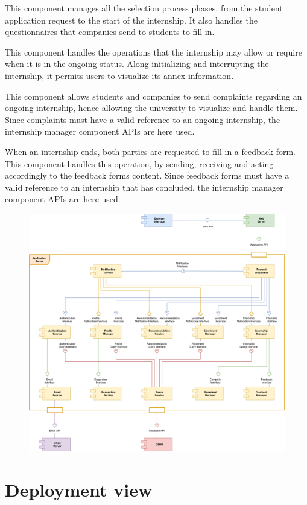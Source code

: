 This component manages all the selection process phases, from the student application request to the start of the internship.
It also handles the questionnaires that companies send to students to fill in.

This component handles the operations that the internship may allow or require when it is in the ongoing status.
Along initializing and interrupting the internship, it permits users to visualize its annex information.

This component allows students and companies to send complaints regarding an ongoing internship, hence allowing the university to visualize and handle them.
Since complaints must have a valid reference to an ongoing internship, the internship manager component APIs are here used.

When an internship ends, both parties are requested to fill in a feedback form.
This component handles this operation, by sending, receiving and acting accordingly to the feedback forms content.
Since feedback forms must have a valid reference to an internship that has concluded, the internship manager component APIs are here used.

\begin{figure}[H]
    \centering
    \includegraphics[width=0.8\linewidth]{../../assets/components-diagrams/components-diagram.png}
\end{figure}

\section{Deployment view}

